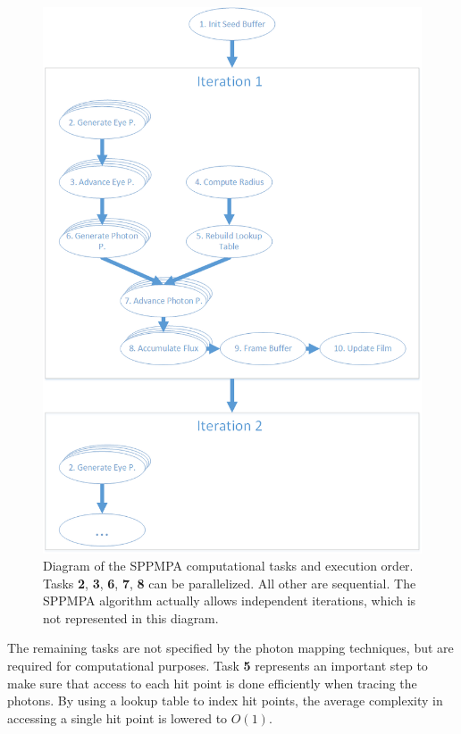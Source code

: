 \documentclass[main.tex]{subfiles}
\begin{document}
\begin{figure}
  \centering
  \includegraphics[width=\textwidth]{visio/diagram_cpu}
  \caption[Diagram of SPPMPA computational tasks and execution order]{Diagram of the SPPMPA computational tasks and execution order. Tasks \textbf{2}, \textbf{3}, \textbf{6}, \textbf{7}, \textbf{8} can be parallelized. All other are sequential. The SPPMPA algorithm actually allows independent iterations, which is not represented in this diagram.}
  \label{fig:diagram_cpu}
\end{figure}

The remaining tasks are not specified by the photon mapping techniques, but are required for computational purposes. Task \textbf{5} represents an important step to make sure that access to each hit point is done efficiently when tracing the photons. By using a lookup table to index hit points, the average complexity in accessing a single hit point is lowered to $O(1)$.
\end{document}

